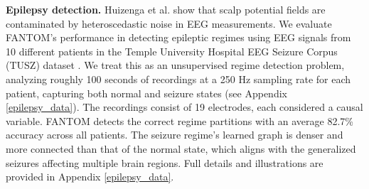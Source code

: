 \textbf{Epilepsy detection. }Huizenga et al. \citep{huizenga1995equivalent} show that scalp potential fields are contaminated by heteroscedastic noise in EEG measurements. We evaluate FANTOM’s performance in detecting epileptic regimes using EEG signals from 10 different patients in the Temple University Hospital EEG Seizure Corpus (TUSZ) dataset \citep{rahmani2023meta, tang2021self}. We treat this as an unsupervised regime detection problem, analyzing roughly 100 seconds of recordings at a 250 Hz sampling rate for each patient, capturing both normal and seizure states (see Appendix \ref{epilepsy_data}). The recordings consist of 19 electrodes, each considered a causal variable. FANTOM detects the correct regime partitions with an average 82.7\% accuracy across all patients. The seizure regime’s learned graph is denser and more connected than that of the normal state, which aligns with the generalized seizures affecting multiple brain regions. Full details and illustrations are provided in Appendix \ref{epilepsy_data}.
